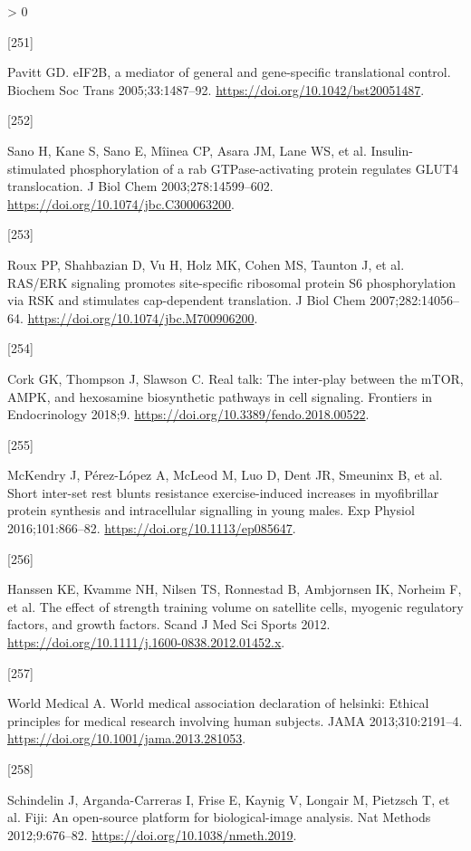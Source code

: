 \documentclass[twoside,10pt]{gihclass} %
\newlength{\cslhangindent}
\newlength{\csllabelwidth}
\newenvironment{CSLReferences}[3] %
 {%
  \setlength{\parindent}{0pt}
  \ifodd #1 \everypar{\setlength{\hangindent}{\cslhangindent}}\ignorespaces\fi
  \ifnum #2 > 0
  \setlength{\parskip}{#2\baselineskip}
  \fi
 }%
 {}
\newcommand{\CSLLeftMargin}[1]{\parbox[t]{\maxof{\widthof{#1}}{\csllabelwidth}}{#1}}
\newcommand{\CSLRightInline}[1]{\parbox[t]{\linewidth}{#1}}
\begin{document}
\begin{CSLReferences}{0}{0}
\leavevmode\hypertarget{ref-RN2853}{}%
\CSLLeftMargin{{[}251{]} }
\CSLRightInline{Pavitt GD. eIF2B, a mediator of general and gene-specific translational control. Biochem Soc Trans 2005;33:1487--92. \url{https://doi.org/10.1042/bst20051487}.}

\leavevmode\hypertarget{ref-RN2856}{}%
\CSLLeftMargin{{[}252{]} }
\CSLRightInline{Sano H, Kane S, Sano E, Mîinea CP, Asara JM, Lane WS, et al. Insulin-stimulated phosphorylation of a rab GTPase-activating protein regulates GLUT4 translocation. J Biol Chem 2003;278:14599--602. \url{https://doi.org/10.1074/jbc.C300063200}.}

\leavevmode\hypertarget{ref-RN2311}{}%
\CSLLeftMargin{{[}253{]} }
\CSLRightInline{Roux PP, Shahbazian D, Vu H, Holz MK, Cohen MS, Taunton J, et al. RAS/ERK signaling promotes site-specific ribosomal protein S6 phosphorylation via RSK and stimulates cap-dependent translation. J Biol Chem 2007;282:14056--64. \url{https://doi.org/10.1074/jbc.M700906200}.}

\leavevmode\hypertarget{ref-RN2858}{}%
\CSLLeftMargin{{[}254{]} }
\CSLRightInline{Cork GK, Thompson J, Slawson C. Real talk: The inter-play between the mTOR, AMPK, and hexosamine biosynthetic pathways in cell signaling. Frontiers in Endocrinology 2018;9. \url{https://doi.org/10.3389/fendo.2018.00522}.}

\leavevmode\hypertarget{ref-RN2857}{}%
\CSLLeftMargin{{[}255{]} }
\CSLRightInline{McKendry J, Pérez-López A, McLeod M, Luo D, Dent JR, Smeuninx B, et al. Short inter-set rest blunts resistance exercise-induced increases in myofibrillar protein synthesis and intracellular signalling in young males. Exp Physiol 2016;101:866--82. \url{https://doi.org/10.1113/ep085647}.}

\leavevmode\hypertarget{ref-RN796}{}%
\CSLLeftMargin{{[}256{]} }
\CSLRightInline{Hanssen KE, Kvamme NH, Nilsen TS, Ronnestad B, Ambjornsen IK, Norheim F, et al. The effect of strength training volume on satellite cells, myogenic regulatory factors, and growth factors. Scand J Med Sci Sports 2012. \url{https://doi.org/10.1111/j.1600-0838.2012.01452.x}.}

\leavevmode\hypertarget{ref-RN1590}{}%
\CSLLeftMargin{{[}257{]} }
\CSLRightInline{World Medical A. World medical association declaration of helsinki: Ethical principles for medical research involving human subjects. JAMA 2013;310:2191--4. \url{https://doi.org/10.1001/jama.2013.281053}.}

\leavevmode\hypertarget{ref-RN2561}{}%
\CSLLeftMargin{{[}258{]} }
\CSLRightInline{Schindelin J, Arganda-Carreras I, Frise E, Kaynig V, Longair M, Pietzsch T, et al. Fiji: An open-source platform for biological-image analysis. Nat Methods 2012;9:676--82. \url{https://doi.org/10.1038/nmeth.2019}.}


\end{CSLReferences}
\end{document}
